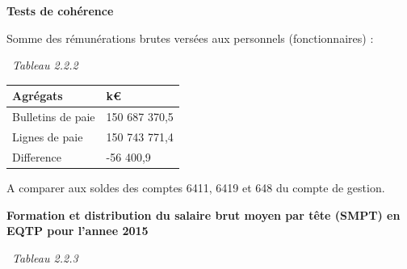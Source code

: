\textbf{Tests de cohérence}

Somme des rémunérations brutes versées aux personnels (fonctionnaires) :

~\emph{Tableau 2.2.2}

\begin{longtable}[]{@{}ll@{}}
\toprule
Agrégats & k€\tabularnewline
\midrule
\endhead
Bulletins de paie & 150 687 370,5\tabularnewline
Lignes de paie & 150 743 771,4\tabularnewline
Difference & -56 400,9\tabularnewline
\bottomrule
\end{longtable}

A comparer aux soldes des comptes 6411, 6419 et 648 du compte de
gestion.

\textbf{Formation et distribution du salaire brut moyen par tête (SMPT)
en EQTP pour l'annee 2015 }

~\emph{Tableau 2.2.3}

